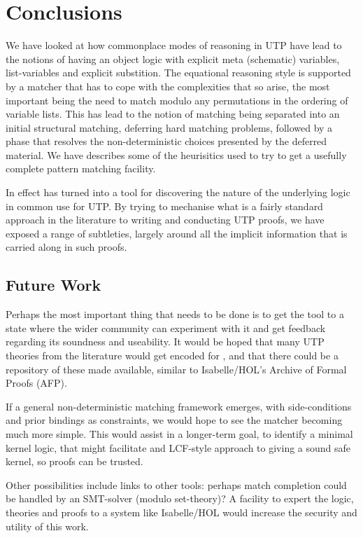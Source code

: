 \section{Conclusions}\label{sec:conclusions}


We have looked at how commonplace modes of reasoning in UTP
have lead to the notions of having an object logic
with explicit meta (schematic) variables, list-variables
and explicit substition.
The equational reasoning style is supported by a matcher
that has to cope with the complexities that so arise,
the most important being the need to match modulo any permutations
in the ordering of variable lists.
This has lead to the notion of matching being separated into an initial
structural matching, deferring hard matching problems,
followed by a phase that resolves the non-deterministic choices
presented by the deferred material.
We have describes some of the heurisitics used to try to get
a usefully complete pattern matching facility.


In effect  has turned into a tool for discovering the nature of the
underlying logic in common use for UTP.
By trying to mechanise what is a fairly standard approach in the literature
to writing and conducting UTP proofs,
we have exposed a range of subtleties, largely around all the implicit
information that is carried along in such proofs.


\subsection{Future Work}

Perhaps the most important thing that needs to be done
is to get the tool to a state where the wider community can experiment with
it and get feedback regarding its soundness and useability.
It would be hoped that many UTP theories from the literature
would get encoded for , and that there could be a repository of these
made available, similar to Isabelle/HOL's Archive of Formal Proofs (AFP).

If a general non-deterministic matching framework emerges,
with side-conditions and prior bindings as constraints,
we would hope to see the matcher becoming much more simple.
This would assist in a longer-term goal,
to identify a minimal kernel logic, that might facilitate and LCF-style
approach to giving a sound safe kernel, so proofs can be trusted.

Other possibilities include links to other tools:
perhaps match completion could be handled by an SMT-solver (modulo set-theory)?
A facility to expert the logic, theories and proofs to a system like
Isabelle/HOL would increase the security and utility of this work.
